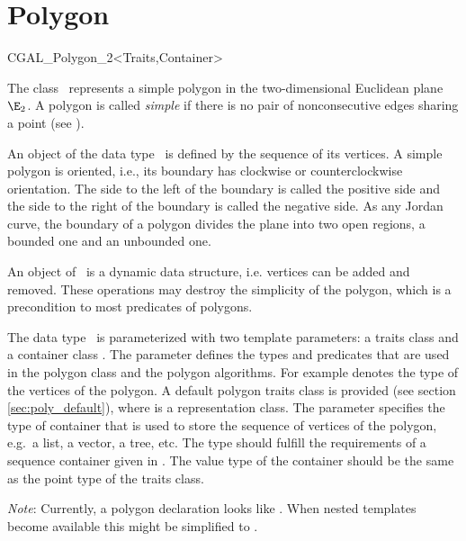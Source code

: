 
\cleardoublepage
\chapter{Polygon}\label{Polygon}

\begin{ccClassTemplate}{CGAL_Polygon_2<Traits,Container>}

\ccDefinition

The class \ccClassName\ represents a simple polygon in the two-dimensional
Euclidean plane $\E_2$. A polygon is called {\em simple} if there is no pair
of nonconsecutive edges sharing a point (see \cite{ps-cgi-85}).

An object  of the data type \ccClassName\ is defined by the sequence
of its vertices. A simple polygon  is oriented, i.e., its boundary has
clockwise or counterclockwise orientation. The side to the left of the boundary
is called the positive side and the side to the right of the boundary is called
the negative side.  As any Jordan curve, the boundary of a polygon divides the
plane into two open regions, a bounded one and an unbounded one.

An object  of \ccClassName\ is a dynamic data
structure, i.e. vertices can be added and removed. These operations may
destroy the simplicity of the polygon, which is a precondition to most
predicates of polygons.

The data type \ccClassName\ is parameterized with two template parameters: 
a traits class  and a container class . 
The parameter  defines the types and predicates
that are used in the polygon class and the polygon algorithms.
For example  denotes the type of the vertices
of the polygon. A default polygon traits class
 is provided (see section \ref{sec:poly_default}),
where  is a representation class.
The parameter  specifies the type of container that is 
used to store the sequence of vertices of the polygon, e.g.\ a list, a vector, 
a tree, etc.
The type  should fulfill the requirements of a sequence 
container given in \cite{ms-strg-96}. 
The value type of the container should be the same as the point type of the 
traits class.

{\em Note}: Currently, a polygon declaration looks like
.
When nested templates become available this might be simplified to
.


\end{ccClassTemplate}
